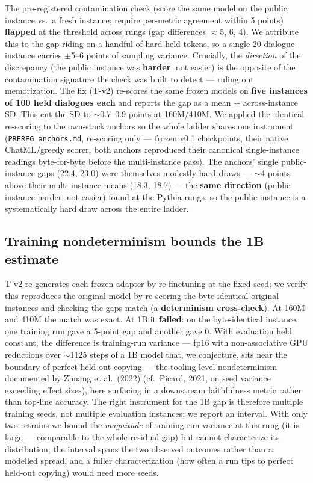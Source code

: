 \documentclass[11pt]{article}
\begin{document}
The pre-registered contamination check (score the same model on the public instance vs.~a fresh instance; require per-metric agreement within 5 points) \textbf{flapped} at the threshold across rungs (gap differences $\approx$5, 6, 4). We attribute this to the gap riding on a handful of hard held tokens, so a single 20-dialogue instance carries $\pm$5--6 points of sampling variance. Crucially, the \emph{direction} of the discrepancy (the public instance was \textbf{harder}, not easier) is the opposite of the contamination signature the check was built to detect --- ruling out memorization. The fix (T-v2) re-scores the same frozen models on \textbf{five instances of 100 held dialogues each} and reports the gap as a mean $\pm$ across-instance SD. This cut the SD to $\sim$0.7--0.9 points at 160M/410M. We applied the identical re-scoring to the own-stack anchors so the whole ladder shares one instrument (\texttt{PREREG\_anchors.md}, re-scoring only --- frozen v0.1 checkpoints, their native ChatML/greedy scorer; both anchors reproduced their canonical single-instance readings byte-for-byte before the multi-instance pass). The anchors' single public-instance gaps (22.4, 23.0) were themselves modestly hard draws --- $\sim$4 points above their multi-instance means (18.3, 18.7) --- the \textbf{same direction} (public instance harder, not easier) found at the Pythia rungs, so the public instance is a systematically hard draw across the entire ladder.

\subsection{Training nondeterminism bounds the 1B estimate}\label{sec:nondet}

T-v2 re-generates each frozen adapter by re-finetuning at the fixed seed; we verify this reproduces the original model by re-scoring the byte-identical original instances and checking the gaps match (a \textbf{determinism cross-check}). At 160M and 410M the match was exact. At 1B it \textbf{failed}: on the byte-identical instance, one training run gave a 5-point gap and another gave 0. With evaluation held constant, the difference is training-run variance --- fp16 with non-associative GPU reductions over $\sim$1125 steps of a 1B model that, we conjecture, sits near the boundary of perfect held-out copying --- the tooling-level nondeterminism documented by Zhuang et al.~(2022) (cf.~Picard, 2021, on seed variance exceeding effect sizes), here surfacing in a downstream faithfulness metric rather than top-line accuracy. The right instrument for the 1B gap is therefore multiple training seeds, not multiple evaluation instances; we report an interval. With only two retrains we bound the \emph{magnitude} of training-run variance at this rung (it is large --- comparable to the whole residual gap) but cannot characterize its distribution; the interval spans the two observed outcomes rather than a modelled spread, and a fuller characterization (how often a run tips to perfect held-out copying) would need more seeds.
\end{document}
